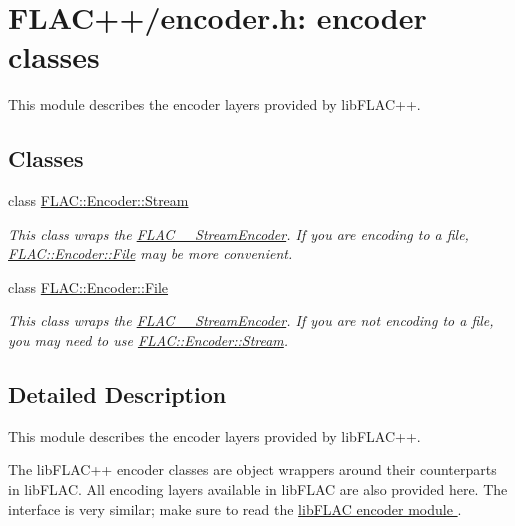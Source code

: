 \hypertarget{group__flacpp__encoder}{}\section{F\+L\+A\+C++/encoder.h\+: encoder classes}
\label{group__flacpp__encoder}


This module describes the encoder layers provided by lib\+F\+L\+A\+C++.  


\subsection*{Classes}
\begin{DoxyCompactItemize}
\item 
class \hyperlink{class_f_l_a_c_1_1_encoder_1_1_stream}{F\+L\+A\+C\+::\+Encoder\+::\+Stream}
\begin{DoxyCompactList}\small\item\em This class wraps the \hyperlink{struct_f_l_a_c_____stream_encoder}{F\+L\+A\+C\+\_\+\+\_\+\+Stream\+Encoder}. If you are encoding to a file, \hyperlink{class_f_l_a_c_1_1_encoder_1_1_file}{F\+L\+A\+C\+::\+Encoder\+::\+File} may be more convenient. \end{DoxyCompactList}\item 
class \hyperlink{class_f_l_a_c_1_1_encoder_1_1_file}{F\+L\+A\+C\+::\+Encoder\+::\+File}
\begin{DoxyCompactList}\small\item\em This class wraps the \hyperlink{struct_f_l_a_c_____stream_encoder}{F\+L\+A\+C\+\_\+\+\_\+\+Stream\+Encoder}. If you are not encoding to a file, you may need to use \hyperlink{class_f_l_a_c_1_1_encoder_1_1_stream}{F\+L\+A\+C\+::\+Encoder\+::\+Stream}. \end{DoxyCompactList}\end{DoxyCompactItemize}


\subsection{Detailed Description}
This module describes the encoder layers provided by lib\+F\+L\+A\+C++. 

The lib\+F\+L\+A\+C++ encoder classes are object wrappers around their counterparts in lib\+F\+L\+AC. All encoding layers available in lib\+F\+L\+AC are also provided here. The interface is very similar; make sure to read the \hyperlink{group__flac__encoder}{lib\+F\+L\+AC encoder module }.

